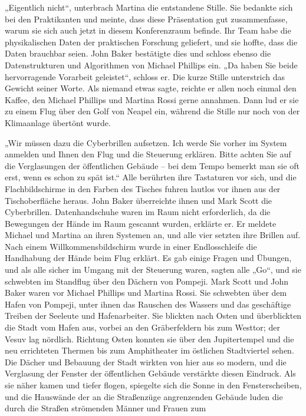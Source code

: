 \documentclass[
]{article}
\begin{document}
„Eigentlich nicht``, unterbrach Martina die entstandene Stille. Sie
bedankte sich bei den Praktikanten und meinte, dass diese Präsentation
gut zusammenfasse, warum sie sich auch jetzt in diesem Konferenzraum
befinde. Ihr Team habe die physikalischen Daten der praktischen
Forschung geliefert, und sie hoffte, dass die Daten brauchbar seien.
John Baker bestätigte dies und schloss ebenso die Datenstrukturen und
Algorithmen von Michael Phillips ein. „Da haben Sie beide hervorragende
Vorarbeit geleistet``, schloss er. Die kurze Stille unterstrich das
Gewicht seiner Worte. Als niemand etwas sagte, reichte er allen noch
einmal den Kaffee, den Michael Phillips und Martina Rossi gerne
annahmen. Dann lud er sie zu einem Flug über den Golf von Neapel ein,
während die Stille nur noch von der Klimaanlage übertönt wurde.

„Wir müssen dazu die Cyberbrillen aufsetzen. Ich werde Sie vorher im
System anmelden und Ihnen den Flug und die Steuerung erklären. Bitte
achten Sie auf die Verglasungen der öffentlichen Gebäude -- bei dem
Tempo bemerkt man sie oft erst, wenn es schon zu spät ist.`` Alle
berührten ihre Tastaturen vor sich, und die Flachbildschirme in den
Farben des Tisches fuhren lautlos vor ihnen aus der Tischoberfläche
heraus. John Baker überreichte ihnen und Mark Scott die Cyberbrillen.
Datenhandschuhe waren im Raum nicht erforderlich, da die Bewegungen der
Hände im Raum gescannt wurden, erklärte er. Er meldete Michael und
Martina an ihren Systemen an, und alle vier setzten ihre Brillen auf.
Nach einem Willkommensbildschirm wurde in einer Endlosschleife die
Handhabung der Hände beim Flug erklärt. Es gab einige Fragen und
Übungen, und als alle sicher im Umgang mit der Steuerung waren, sagten
alle „Go``, und sie schwebten im Standflug über den Dächern von Pompeji.
Mark Scott und John Baker waren vor Michael Phillips und Martina Rossi.
Sie schwebten über dem Hafen von Pompeji, unter ihnen das Rauschen des
Wassers und das geschäftige Treiben der Seeleute und Hafenarbeiter. Sie
blickten nach Osten und überblickten die Stadt vom Hafen aus, vorbei an
den Gräberfeldern bis zum Westtor; der Vesuv lag nördlich. Richtung
Osten konnten sie über den Jupitertempel und die neu errichteten Thermen
bis zum Amphitheater im östlichen Stadtviertel sehen. Die Dächer und
Bebauung der Stadt wirkten von hier aus so modern, und die Verglasung
der Fenster der öffentlichen Gebäude verstärkte diesen Eindruck. Als sie
näher kamen und tiefer flogen, spiegelte sich die Sonne in den
Fensterscheiben, und die Hauswände der an die Straßenzüge angrenzenden
Gebäude luden die durch die Straßen strömenden Männer und Frauen zum
\end{document}
